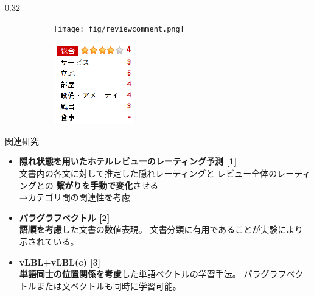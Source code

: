 \documentclass[8pt,unicode]{beamer}
\newcommand{\columnscale}{0.32}
\newcommand{\itemtitle}[1]{\textbf{#1} \\}
\newcommand{\arrow}{{\color{ttiblue} →}\hspace{1ex}}
\newcommand{\good}[1]{\textbf{\color{orange} #1}}
\newcommand{\bad}[1]{\textbf{\color{blue} #1}}
\begin{document}
\begin{frame}{}
\begin{columns}[t]
\begin{column}{\columnscale\textwidth}
  \vspace{-1em} %
  \begin{figure}
    \caption{例. カテゴリ毎のラベルが付いた文書（商品レビュー）}
    \begin{subfigure}{0.52\textwidth}
      \texttt{[image: fig/reviewcomment.png]}
    \end{subfigure}
    \begin{subfigure}{0.32\textwidth}
      \includegraphics[width=\textwidth]{fig/reviewpoints.png}
    \end{subfigure}
  \end{figure}

  \begin{block}{関連研究}
    \begin{itemize}
      \item \itemtitle{隠れ状態を用いたホテルレビューのレーティング予測 [1]}
        文書内の各文に対して推定した隠れレーティングと
        レビュー全体のレーティングとの\bad{繋がりを手動で変化}させる \\
        \arrow カテゴリ間の関連性を考慮
      \item \itemtitle{パラグラフベクトル [2]}
        \good{語順を考慮}した文書の数値表現。
        文書分類に有用であることが実験により示されている。
      \item \itemtitle{vLBL+vLBL(c) [3]}
        \good{単語同士の位置関係を考慮}した単語ベクトルの学習手法。
        パラグラフベクトルまたは文ベクトルも同時に学習可能。
    \end{itemize}
  \end{block}


\end{column}
\end{columns}
\end{frame}
\end{document}
